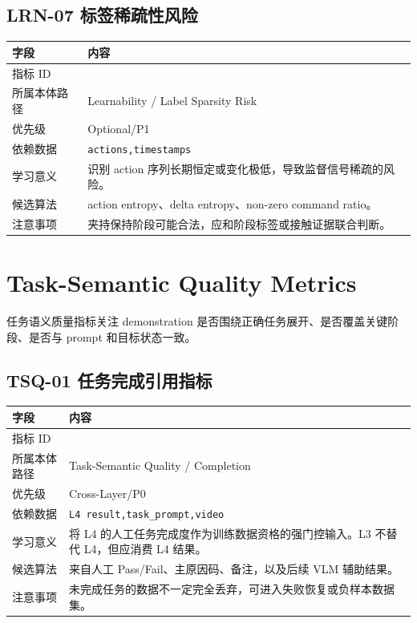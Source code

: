 \documentclass[UTF8,zihao=-4]{ctexart}
\newcommand{\Code}[1]{\texttt{#1}}
\newcommand{\MID}[1]{\texttt{\seqsplit{#1}}}
\begin{document}
\subsection{LRN-07 标签稀疏性风险}

\begin{longtable}{L{3.6cm} L{9.6cm}}
\toprule
字段 & 内容 \\
\midrule
指标 ID & \MID{LRN-07} \\
所属本体路径 & Learnability / Label Sparsity Risk \\
优先级 & Optional/P1 \\
依赖数据 & \Code{actions,timestamps} \\
学习意义 & 识别 action 序列长期恒定或变化极低，导致监督信号稀疏的风险。 \\
候选算法 & action entropy、delta entropy、non-zero command ratio。 \\
注意事项 & 夹持保持阶段可能合法，应和阶段标签或接触证据联合判断。 \\
\bottomrule
\end{longtable}

\section{Task-Semantic Quality Metrics}

任务语义质量指标关注 demonstration 是否围绕正确任务展开、是否覆盖关键阶段、是否与 prompt 和目标状态一致。


\subsection{TSQ-01 任务完成引用指标}

\begin{longtable}{L{3.6cm} L{9.6cm}}
\toprule
字段 & 内容 \\
\midrule
指标 ID & \MID{TSQ-01} \\
所属本体路径 & Task-Semantic Quality / Completion \\
优先级 & Cross-Layer/P0 \\
依赖数据 & \Code{L4 result,task\_prompt,video} \\
学习意义 & 将 L4 的人工任务完成度作为训练数据资格的强门控输入。L3 不替代 L4，但应消费 L4 结果。 \\
候选算法 & 来自人工 Pass/Fail、主原因码、备注，以及后续 VLM 辅助结果。 \\
注意事项 & 未完成任务的数据不一定完全丢弃，可进入失败恢复或负样本数据集。 \\
\bottomrule
\end{longtable}
\end{document}
